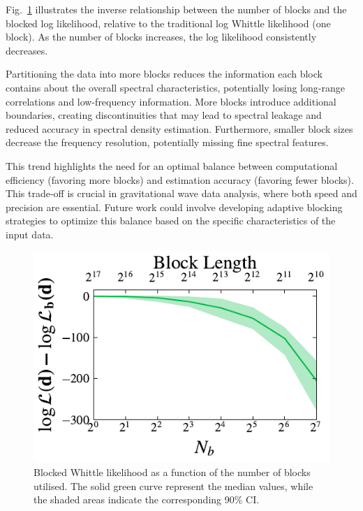 \documentclass[%
 reprint,
 amsmath,amssymb,
 aps,
 nofootinbib,
]{revtex4-2}
\begin{document}
Fig.~\ref{fig:lnl_vs_nchunks} illustrates the inverse relationship between the number of blocks and the blocked log likelihood, relative to the traditional log Whittle likelihood (one block). 
As the number of blocks increases, the log likelihood consistently decreases.

Partitioning the data into more blocks reduces the information each block contains about the overall spectral characteristics, potentially losing long-range correlations and low-frequency information. More blocks introduce additional boundaries, creating discontinuities that may lead to spectral leakage and reduced accuracy in spectral density estimation. Furthermore, smaller block sizes decrease the frequency resolution, potentially missing fine spectral features.

This trend highlights the need for an optimal balance between computational efficiency (favoring more blocks) and estimation accuracy (favoring fewer blocks). This trade-off is crucial in gravitational wave data analysis, where both speed and precision are essential. Future work could involve developing adaptive blocking strategies to optimize this balance based on the specific characteristics of the input data.


\begin{figure}[h]
  \includegraphics[width=\columnwidth]{lnl_vs_nchunks}
  \caption{Blocked Whittle likelihood as a function of the number of blocks utilised. The solid green curve represent the median values, while the shaded areas indicate the corresponding 90\% CI.}
  \label{fig:lnl_vs_nchunks}
\end{figure}
\end{document}

